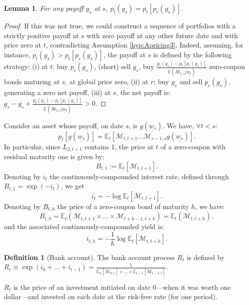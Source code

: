 \documentclass[
  12pt,
]{book}
\newtheorem{lemma}{Lemma}[chapter]
\theoremstyle{definition}
\newtheorem{definition}{Definition}[chapter]
\theoremstyle{definition}
\theoremstyle{definition}
\theoremstyle{definition}
\theoremstyle{remark}
\begin{document}
\begin{lemma}
\protect\hypertarget{lem:sdf}{}\label{lem:sdf}For any payoff \(g_s\) at \(s\), \(p_t(g_s) = p_t[p_r(g_s)]\).
\end{lemma}

\begin{proof}
If this was not true, we could construct a sequence of portfolios with a strictly positive payoff at \(s\) with zero payoff at any other future date and with price zero at \(t\), contradicting Assumption \ref{hyp:Apricing3}. Indeed, assuming, for instance, \(p_t(g_s) > p_t[p_r(g_s)]\), the payoff at \(s\) is defined by the following strategy: (i) at \(t\): buy \(p_r(g_s)\), (short) sell \(g_s\), buy
\(\frac{p_t(g_s)-p_t[p_r(g_s)]}{\mathbb{E}(\mathcal{M}_{t,s}|\underline{w_t})}\) zero-coupon bonds maturing at \(s\), at global price zero, (ii) at \(r\): buy \(g_s\) and sell \(p_r(g_s)\), generating a zero net payoff, (iii) at \(s\), the net payoff is: \(g_s-g_s+\frac{p_t(g_s)-p_t[p_r(g_s)]}{\mathbb{E}(\mathcal{M}_{t,s}|\underline{w_t})} > 0\).
\end{proof}

Consider an asset whose payoff, on date \(s\), is \(g(\underline{w_s})\). We have, \(\forall t < s\):
\begin{equation}
\boxed{p_t[g(\underline{w_s})] = \mathbb{E}_t[\mathcal{M}_{t,t+1}...\mathcal{M}_{s-1,s}g(\underline{w_s})].}\label{eq:basic}
\end{equation}
In particular, since \(L_{2,t+1}\) contains 1, the price at \(t\) of a zero-coupon with residual maturity one is given by:
\[
B_{t,1} := \mathbb{E}_t [\mathcal{M}_{t,t+1}].
\]
Denoting by \(i_t\) the continuously-compounded interest rate, defined through \(B_{t,1}=\exp(-i_{t})\), we get
\begin{equation}
\boxed{i_{t}=-\log \mathbb{E}_t [\mathcal{M}_{t,t+1}].}\label{eq:iandM}
\end{equation}
Denoting by \(B_{t,h}\) the price of a zero-coupon bond of maturity \(h\), we have:
\[
B_{t,h} = \mathbb{E}_t(\mathcal{M}_{t,t+1}\times \dots \times \mathcal{M}_{t+h-1,t+h})=\mathbb{E}_t(\mathcal{M}_{t,t+h}),
\]
and the associated continuously-compounded yield is:
\begin{equation}
\boxed{i_{t,h}=-\frac{1}{h}\log \mathbb{E}_t [\mathcal{M}_{t,t+h}].}\label{eq:ihandM}
\end{equation}

\begin{definition}[Bank account]
\protect\hypertarget{def:bankaccount}{}\label{def:bankaccount}The bank account process \(R_t\) is defined by \(R_{t} \equiv \exp(i_0+...+i_{t-1}) = \frac{1}{\mathbb{E}_0[ \mathcal{M}_{0,1}]\times ... \times \mathbb{E}_{t-1} [\mathcal{M}_{t-1,t}]}\).

\(R_t\) is the price of an investment initiated on date 0---when it was worth one dollar---and invested on each date at the risk-free rate (for one period).
\end{definition}
\end{document}
